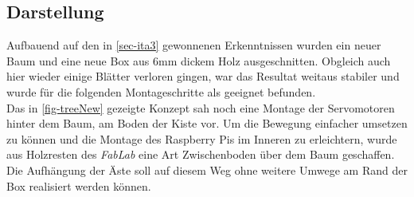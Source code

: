 \documentclass[.../Dokumentation.tex]{subfiles}
\begin{document}
\subsection{Darstellung}\label{sec-ita4-visualization}
Aufbauend auf den in \ref{sec-ita3} gewonnenen Erkenntnissen wurden ein neuer 
Baum und eine neue Box aus 6mm dickem Holz ausgeschnitten. Obgleich auch hier 
wieder einige Blätter verloren gingen, war das Resultat weitaus stabiler und 
wurde für die folgenden Montageschritte als geeignet befunden.\\
Das in \ref{fig-treeNew} gezeigte Konzept sah noch eine Montage der 
Servomotoren hinter dem Baum, am Boden der Kiste vor. 
Um die Bewegung einfacher umsetzen zu können und die Montage des Raspberry 
Pis im Inneren zu erleichtern, wurde aus Holzresten des \textit{FabLab} eine 
Art Zwischenboden über dem Baum geschaffen. Die Aufhängung der Äste soll 
auf diesem Weg ohne weitere Umwege am Rand der Box realisiert werden können.
\end{document}

